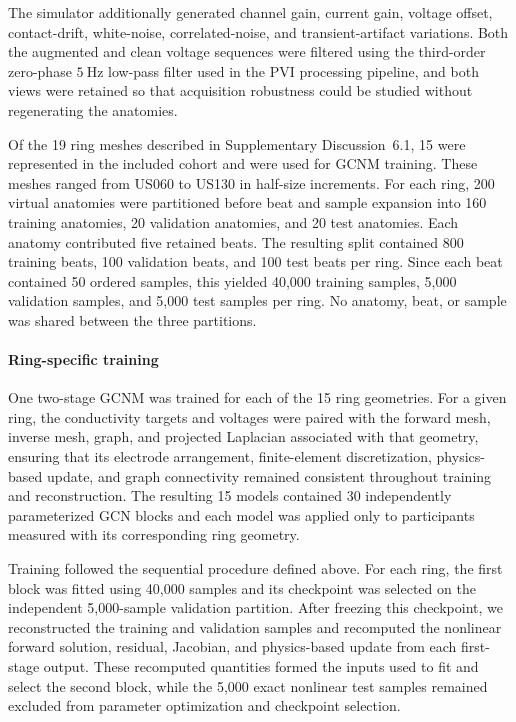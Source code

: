 \documentclass[11pt]{article}
\begin{document}
The simulator additionally generated channel gain, current gain, voltage offset, contact-drift, white-noise, correlated-noise, and transient-artifact variations.
Both the augmented and clean voltage sequences were filtered using the third-order zero-phase $5~\mathrm{Hz}$ low-pass filter used in the PVI processing pipeline, and both views were retained so that acquisition robustness could be studied without regenerating the anatomies.

Of the 19 ring meshes described in Supplementary Discussion~6.1, 15 were represented in the included cohort and were used for GCNM training.
These meshes ranged from US060 to US130 in half-size increments.
For each ring, 200 virtual anatomies were partitioned before beat and sample expansion into 160 training anatomies, 20 validation anatomies, and 20 test anatomies.
Each anatomy contributed five retained beats.
The resulting split contained 800 training beats, 100 validation beats, and 100 test beats per ring.
Since each beat contained 50 ordered samples, this yielded 40,000 training samples, 5,000 validation samples, and 5,000 test samples per ring.
No anatomy, beat, or sample was shared between the three partitions.


\clearpage
\color{black}

\paragraph{Ring-specific training}
\label{sec:gcnm-ring-training}
\mbox{}\par

One two-stage GCNM was trained for each of the 15 ring geometries.
For a given ring, the conductivity targets and voltages were paired with the forward mesh, inverse mesh, graph, and projected Laplacian associated with that geometry, ensuring that its electrode arrangement, finite-element discretization, physics-based update, and graph connectivity remained consistent throughout training and reconstruction.
The resulting 15 models contained 30 independently parameterized GCN blocks and each model was applied only to participants measured with its corresponding ring geometry.

Training followed the sequential procedure defined above.
For each ring, the first block was fitted using 40,000 samples and its checkpoint was selected on the independent 5,000-sample validation partition.
After freezing this checkpoint, we reconstructed the training and validation samples and recomputed the nonlinear forward solution, residual, Jacobian, and physics-based update from each first-stage output.
These recomputed quantities formed the inputs used to fit and select the second block, while the 5,000 exact nonlinear test samples remained excluded from parameter optimization and checkpoint selection.
\end{document}
